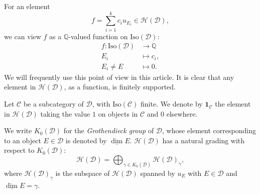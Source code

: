 \documentclass[a4paper,12pt]{amsart}
\numberwithin{equation}{section}
\newcommand{\udv}{\underline{\dim}}
\newcommand{\Iso}{\mathrm{Iso}}
\newcommand{\1}{\mathbf{1}}
\begin{document}
For an element
\[f=\sum_{i=1}^k c_i u_{E_i}\in\mathcal{H}(\mathcal{D}),\]
we can view $f$ as a $\mathbb{Q}$-valued function on $\Iso(\mathcal{D})$:
\begin{align*}
    f:\Iso(\mathcal{D})&\rightarrow\mathbb{Q}\\
    E_i&\mapsto c_i,\\
    E_i\neq E&\mapsto 0.
\end{align*}
We will frequently use this point of view in this article. It is clear that any element in $\mathcal{H}(\mathcal{D})$, as a function, is finitely supported.

Let $\mathcal{C}$ be a subcategory of $\mathcal{D}$, with $\Iso(\mathcal{C})$ finite. We denote by $\1_{\mathcal{C}}$ the element in $\mathcal{H}(\mathcal{D})$ taking the value $1$ on objects in $\mathcal{C}$ and $0$ elsewhere. 

We write $K_0(\mathcal{D})$ for the \emph{Grothendieck group} of $\mathcal{D}$, whose element corresponding to an object $E\in\mathcal{D}$ is denoted by $\udv E$. $\mathcal{H}(\mathcal{D})$ has a natural grading with respect to $K_0(\mathcal{D})$:
\[\mathcal{H}(\mathcal{D})=\bigoplus_{\gamma\in K_0(\mathcal{D})}\mathcal{H}(\mathcal{D})_\gamma,\]
where $\mathcal{H}(\mathcal{D})_\gamma$ is the subspace of $\mathcal{H}(\mathcal{D})$ spanned by $u_E$ with $E\in\mathcal{D}$ and $\udv E=\gamma$.
\end{document}
